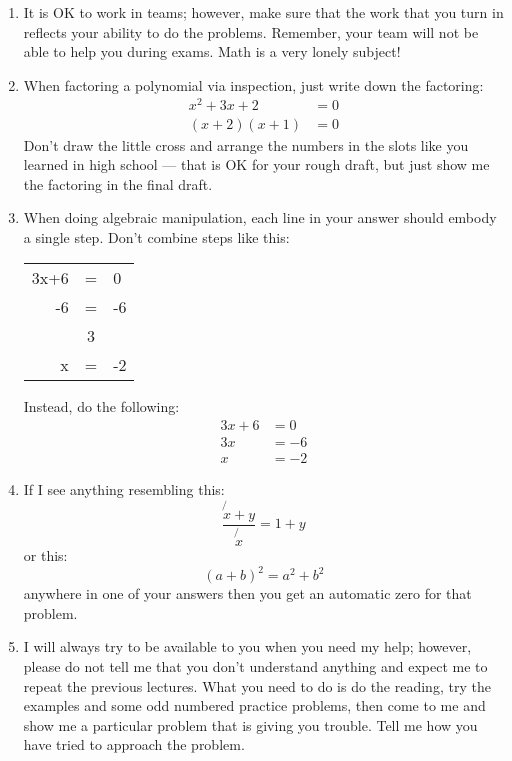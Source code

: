 \documentclass[letterpaper,12pt,fleqn]{article}
\begin{document}
\begin{enumerate}
\item It is OK to work in teams; however, make sure that the work that you turn in reflects your ability to do the problems.
  Remember, your team will not be able to help you during exams.  Math is a very lonely subject!

\item When factoring a polynomial via inspection, just write down the factoring:
\begin{align*}
x^2+3x+2 &= 0 \\
(x+2)(x+1) &= 0
\end{align*}
Don't draw the little cross and arrange the numbers in the slots like you
learned in high school --- that is OK for your rough draft, but just show me
the factoring in the final draft.

\item When doing algebraic manipulation, each line in your answer should
  embody a single step. Don't combine steps like this:

\begin{tabular}{rcl}
3x+6 & = & 0 \\
-6 & = & -6 \\
\hline
 & 3 & \\
x & = & -2
\end{tabular}

Instead, do the following:
\begin{align*}
3x+6 &= 0 \\
3x &= -6 \\
x &= -2
\end{align*}

\item If I see anything resembling this:
\[\frac{\not{x}+y}{\not{x}} = 1+y\]
or this:
\[(a+b)^2=a^2+b^2\]
anywhere in one of your answers then you get an automatic zero for that problem.

\item I will always try to be available to you when you need my help; however, please do not tell me that you don't understand
  anything and expect me to repeat the previous lectures.  What you need to do is do the reading, try the examples and some
  odd numbered practice problems, then come to me and show me a particular problem that is giving you trouble. Tell me how you
  have tried to approach the problem.
\end{enumerate}
\end{document}
